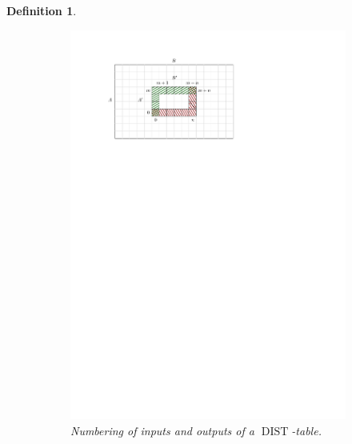 \documentclass[twoside,11pt,openright]{report}
\newcommand{\DIST}{\operatorname{DIST}}
\newtheorem{mydef}{Definition}
\begin{document}
\begin{mydef}
  \begin{figure}[h!]
    \centering
    \begin{subfigure}{0.45\textwidth}
      \includegraphics[width=\textwidth]{images/grid-dist}
      \caption{Numbering of inputs and outputs of a $\DIST$-table.}
    \end{subfigure}
    \begin{subfigure}{0.45\textwidth}

\end{subfigure}
\end{figure}
\end{mydef}
\end{document}

